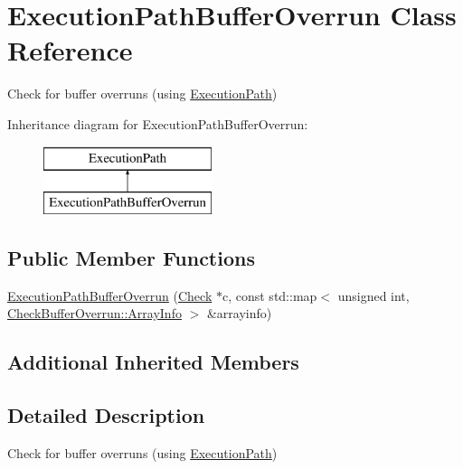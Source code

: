 \hypertarget{class_execution_path_buffer_overrun}{\section{Execution\-Path\-Buffer\-Overrun Class Reference}
\label{class_execution_path_buffer_overrun}
}


Check for buffer overruns (using \hyperlink{class_execution_path}{Execution\-Path})  


Inheritance diagram for Execution\-Path\-Buffer\-Overrun\-:\begin{figure}[H]
\begin{center}
\leavevmode
\includegraphics[height=2.000000cm]{class_execution_path_buffer_overrun}
\end{center}
\end{figure}
\subsection*{Public Member Functions}
\begin{DoxyCompactItemize}
\item 
\hyperlink{class_execution_path_buffer_overrun_a215200eee79746b7318b1970f917892f}{Execution\-Path\-Buffer\-Overrun} (\hyperlink{class_check}{Check} $\ast$c, const std\-::map$<$ unsigned int, \hyperlink{class_check_buffer_overrun_1_1_array_info}{Check\-Buffer\-Overrun\-::\-Array\-Info} $>$ \&arrayinfo)
\end{DoxyCompactItemize}
\subsection*{Additional Inherited Members}


\subsection{Detailed Description}
Check for buffer overruns (using \hyperlink{class_execution_path}{Execution\-Path}) 

